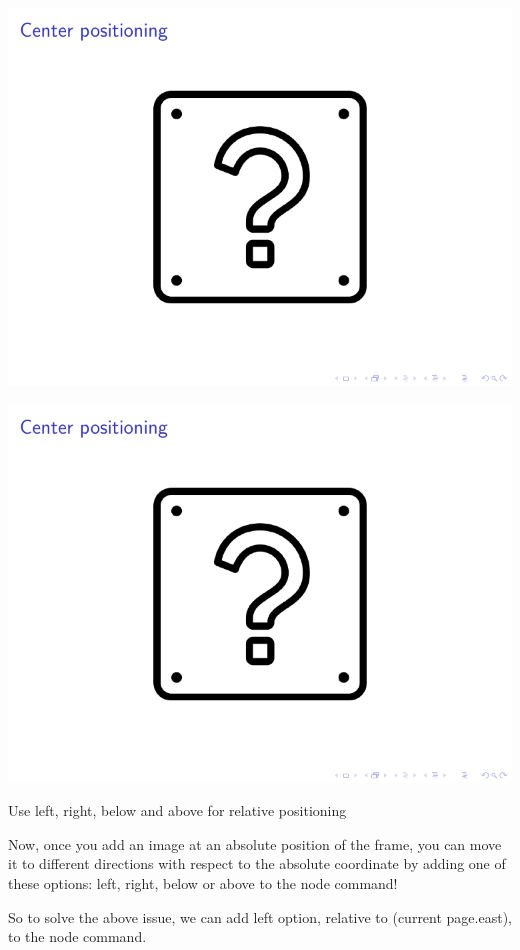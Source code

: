\begin{column}{0.5\textwidth}
\includegraphics[page=1]{examples/beamer/figure-position-with-tikz1.pdf}

\includegraphics[page=2]{examples/beamer/figure-position-with-tikz1.pdf}

Use left, right, below and above for relative positioning

Now, once you add an image at an absolute position of the frame, you can move it to different directions with respect to the absolute coordinate by adding one of these options: left, right, below or above to the node command!

So to solve the above issue, we can add left option, relative to (current page.east), to the node command.


\end{column}
